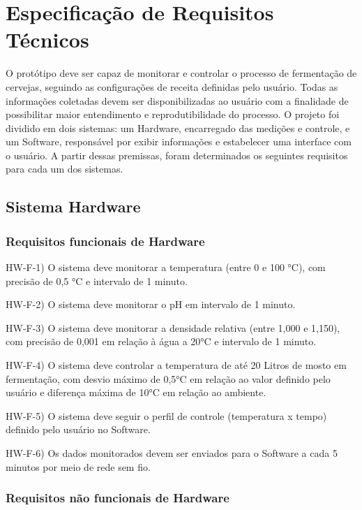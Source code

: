 \section{Especificação de Requisitos Técnicos}

O protótipo deve ser capaz de monitorar e controlar o processo de fermentação de cervejas, seguindo as configurações de receita definidas pelo usuário. 
Todas as informações coletadas devem ser disponibilizadas ao usuário com a finalidade de possibilitar maior entendimento e reprodutibilidade 
do processo. O projeto foi dividido em dois sistemas: um Hardware, encarregado das medições e controle, e um Software, responsável por exibir informações e estabelecer uma interface com o usuário. A partir dessas premissas, foram determinados os seguintes requisitos para cada um dos sistemas.

\subsection{Sistema Hardware}

\subsubsection{Requisitos funcionais de Hardware}

HW-F-1) O sistema deve monitorar a temperatura (entre 0 e 100 °C), com precisão de 0,5 °C e intervalo de 1 minuto.

HW-F-2) O sistema deve monitorar o pH em intervalo de 1 minuto.

HW-F-3) O sistema deve monitorar a densidade relativa (entre 1,000 e 1,150), com precisão de 0,001 em relação à água a 20°C e intervalo de 1 minuto.

HW-F-4) O sistema deve controlar a temperatura de até 20 Litros de mosto em fermentação, com desvio máximo de 0,5°C em relação ao valor definido pelo usuário e diferença máxima de 10°C em relação ao ambiente.

HW-F-5) O sistema deve seguir o perfil de controle (temperatura x tempo) definido pelo usuário no Software.

HW-F-6) Os dados monitorados devem ser enviados para o Software a cada 5 minutos por meio de rede sem fio.

\subsubsection{Requisitos não funcionais de Hardware}


